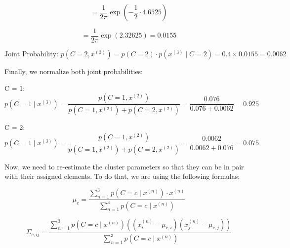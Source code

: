 \documentclass{article}
\begin{document}
\begin{itemize}
\[
= \frac{1}{2\pi} \exp \left( -\frac{1}{2} \cdot 4.6525 \right) 
\]

\[
= \frac{1}{2\pi} \exp(2.32625) = 0.0155
\]

\[
\text{Joint Probability: } p(C = 2, x^{(3)}) = p(C = 2) \cdot p(x^{(3)} \mid C = 2) = 0.4 \times 0.0155 = 0.0062
\]

 Finally, we normalize both joint probabilities:

C = 1:
\[
p(C = 1 \mid x^{(3)}) = \frac{p(C = 1, x^{(2)})}{p(C = 1, x^{(2)}) + p(C = 2, x^{(2)})} = \frac{0.076}{0.076 + 0.0062} = 0.925
\]

C = 2:
\[
p(C = 1 \mid x^{(3)}) = \frac{p(C = 1, x^{(2)})}{p(C = 1, x^{(2)}) + p(C = 2, x^{(2)})} = \frac{0.0062}{0.0062 + 0.076} = 0.075
\]

\end{itemize}

\newpage

Now, we need to re-estimate the cluster parameters so that they can be in pair with their assigned elements. To do that, we are using the following formulas:

\[
\mu_c = \frac{\sum_{n=1}^{3} p(C = c \mid x^{(n)}) \cdot x^{(n)}}{\sum_{n=1}^{3} p(C = c \mid x^{(n)})}
\]

\[
\Sigma_{c,ij} = \frac{\sum_{n=1}^{3} p(C = c \mid x^{(n)}) \left( \left( x^{(n)}_i - \mu_{c,i} \right) \left( x^{(n)}_j - \mu_{c,j} \right) \right)}{\sum_{n=1}^{3} p(C = c \mid x^{(n)})}
\]
\end{document}
